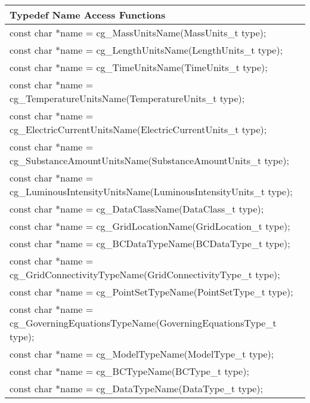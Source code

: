 \begin{table}
\begin{center}
\begin{tabular}{l}
\hline
Typedef Name Access Functions \\
\hline
\textcolor{output}{const char *name} = cg\_MassUnitsName(\textcolor{input}{MassUnits\_t type}); \\
\textcolor{output}{const char *name} = cg\_LengthUnitsName(\textcolor{input}{LengthUnits\_t type}); \\
\textcolor{output}{const char *name} = cg\_TimeUnitsName(\textcolor{input}{TimeUnits\_t type}); \\
\textcolor{output}{const char *name} = cg\_TemperatureUnitsName(\textcolor{input}{TemperatureUnits\_t type}); \\
\textcolor{output}{const char *name} = cg\_ElectricCurrentUnitsName(\textcolor{input}{ElectricCurrentUnits\_t type}); \\
\textcolor{output}{const char *name} = cg\_SubstanceAmountUnitsName(\textcolor{input}{SubstanceAmountUnits\_t type}); \\
\textcolor{output}{const char *name} = cg\_LuminousIntensityUnitsName(\textcolor{input}{LuminousIntensityUnits\_t type}); \\
\textcolor{output}{const char *name} = cg\_DataClassName(\textcolor{input}{DataClass\_t type}); \\
\textcolor{output}{const char *name} = cg\_GridLocationName(\textcolor{input}{GridLocation\_t type}); \\
\textcolor{output}{const char *name} = cg\_BCDataTypeName(\textcolor{input}{BCDataType\_t type}); \\
\textcolor{output}{const char *name} = cg\_GridConnectivityTypeName(\textcolor{input}{GridConnectivityType\_t type}); \\
\textcolor{output}{const char *name} = cg\_PointSetTypeName(\textcolor{input}{PointSetType\_t type}); \\
\textcolor{output}{const char *name} = cg\_GoverningEquationsTypeName(\textcolor{input}{GoverningEquationsType\_t type}); \\
\textcolor{output}{const char *name} = cg\_ModelTypeName(\textcolor{input}{ModelType\_t type}); \\
\textcolor{output}{const char *name} = cg\_BCTypeName(\textcolor{input}{BCType\_t type}); \\
\textcolor{output}{const char *name} = cg\_DataTypeName(\textcolor{input}{DataType\_t type}); \\

\end{tabular}
\end{center}
\end{table}
